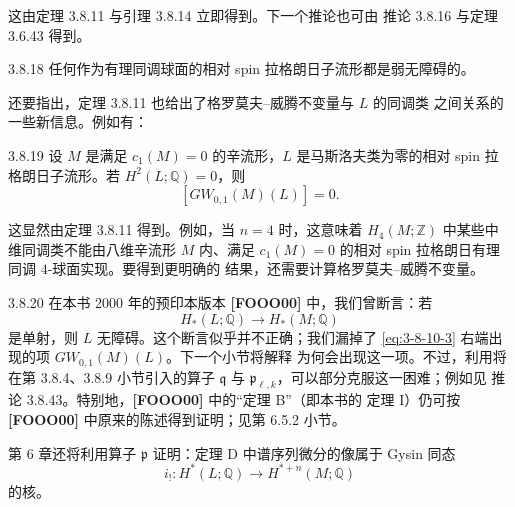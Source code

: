 这由定理 3.8.11 与引理 3.8.14 立即得到。下一个推论也可由
推论 3.8.16 与定理 3.6.43 得到。

\begin{corollary}{3.8.18}\label{cor:3-8-18}
任何作为有理同调球面的相对 spin 拉格朗日子流形都是弱无障碍的。
\end{corollary}

还要指出，定理 3.8.11 也给出了格罗莫夫--威腾不变量与 $L$ 的同调类
之间关系的一些新信息。例如有：

\begin{corollary}{3.8.19}\label{cor:3-8-19}
设 $M$ 是满足 $c_1(M)=0$ 的辛流形，$L$ 是马斯洛夫类为零的相对 spin
拉格朗日子流形。若 $H^2(L;\mathbb Q)=0$，则
\[
 [GW_{0,1}(M)(L)]=0.
\]
\end{corollary}

这显然由定理 3.8.11 得到。例如，当 $n=4$ 时，这意味着
$H_4(M;\mathbb Z)$ 中某些中维同调类不能由八维辛流形 $M$ 内、满足
$c_1(M)=0$ 的相对 spin 拉格朗日有理同调 $4$-球面实现。要得到更明确的
结果，还需要计算格罗莫夫--威腾不变量。

\begin{remark}{3.8.20}\label{rem:3-8-20}
在本书 2000 年的预印本版本 \textbf{[FOOO00]} 中，我们曾断言：若
\[
 H_*(L;\mathbb Q)\longrightarrow H_*(M;\mathbb Q)
\]
是单射，则 $L$ 无障碍。这个断言似乎并不正确；我们漏掉了
\eqref{eq:3-8-10-3} 右端出现的项 $GW_{0,1}(M)(L)$。下一个小节将解释
为何会出现这一项。不过，利用将在第 3.8.4、3.8.9 小节引入的算子
$\mathfrak q$ 与 $\mathfrak p_{\ell,k}$，可以部分克服这一困难；例如见
推论 3.8.43。特别地，\textbf{[FOOO00]} 中的“定理 B”（即本书的
定理 I）仍可按 \textbf{[FOOO00]} 中原来的陈述得到证明；见第 6.5.2
小节。
\end{remark}

第 6 章还将利用算子 $\mathfrak p$ 证明：定理 D 中谱序列微分的像属于
Gysin 同态
\[
 i_!\colon H^*(L;\mathbb Q)\longrightarrow H^{*+n}(M;\mathbb Q)
\]
的核。
